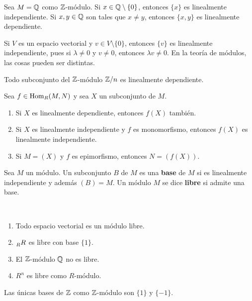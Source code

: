 \begin{example}
Sea $M=\mathbb{Q}$ como $\mathbb{Z}$-módulo. Si $x\in\mathbb{Q}\setminus\{0\}$, entonces $\{x\}$ es linealmente independiente. Si $x,y\in\mathbb{Q}$ son tales
que $x\ne y$, entonces $\{x,y\}$ es linealmente dependiente. 	
\end{example}

Si $V$ es un espacio vectorial y $v\in V\setminus\{0\}$, entonces $\{v\}$ es linealmente independiente, pues
si $\lambda\ne0$ y $v\ne 0$, entonces $\lambda v\ne 0$. 
En la teoría de módulos, las cosas pueden ser distintas. 

\begin{example}
Todo subconjunto del $\mathbb{Z}$-módulo $\mathbb{Z}/n$ es linealmente dependiente. 
\end{example}

\begin{exercise}
Sea $f\in\operatorname{Hom}_R(M,N)$ y sea $X$ un subconjunto de $M$. 
\begin{enumerate}
\item Si $X$ es linealmente dependiente, entonces $f(X)$ también.
\item Si $X$ es linealmente independiente y $f$ es monomorfismo, entonces $f(X)$ es linealmente independiente.
\item Si $M=(X)$ y $f$ es epimorfismo, entonces $N=(f(X))$. 	
\end{enumerate}
\end{exercise}

\begin{definition}
	Sea $M$ un módulo. Un subconjunto $B$ de $M$ es una \textbf{base} de $M$ si 
	es linealmente independiente y además $(B)=M$. Un módulo $M$ se dice \textbf{libre} si 
	admite una base.  
\end{definition}

\begin{examples}\
\begin{enumerate}
	\item Todo espacio vectorial es un módulo libre.
	\item $\prescript{}{R}R$ es libre con base $\{1\}$. 
	\item El $\mathbb{Z}$-módulo $\mathbb{Q}$ no es libre.  
	\item $R^n$ es libre como $R$-módulo.
\end{enumerate}	
\end{examples}

\begin{example}
Las únicas bases de $\mathbb{Z}$ como $\mathbb{Z}$-módulo son $\{1\}$ y $\{-1\}$.	
\end{example}

